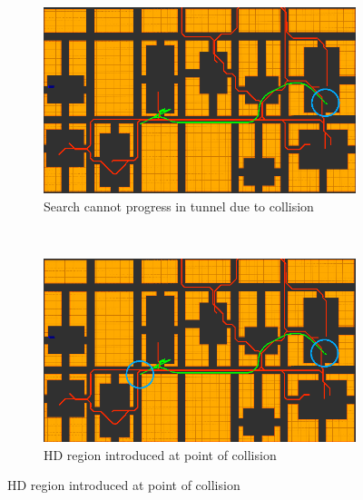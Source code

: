\begin{figure}[ht]
  \begin{subfigure}[t]{0.45\linewidth}
    \centering
    \includegraphics[width=\linewidth]{Figures/alg3_c.png}
    \caption{Search cannot progress in tunnel due to collision}
  \end{subfigure}
  ~
  \begin{subfigure}[t]{0.45\linewidth}
    \centering
    \includegraphics[width=\linewidth]{Figures/alg4_c.png}
    \caption{HD region introduced at point of collision}
  \end{subfigure}


\end{figure}
